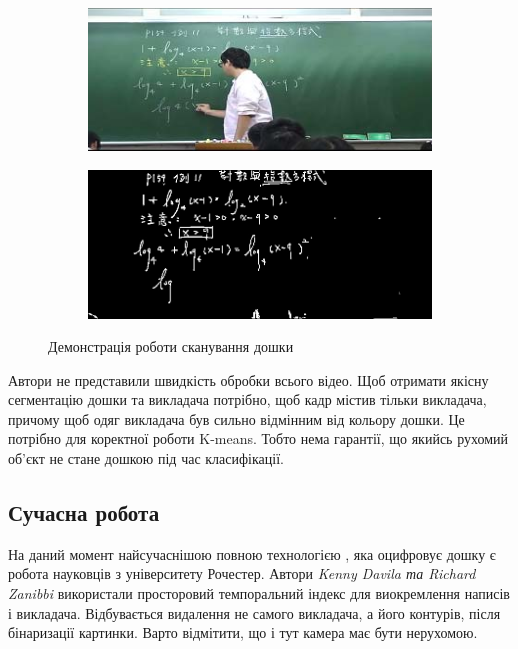 \begin{figure}[h]
  \centering
  \begin{subfigure}[b]{0.3\textwidth}
    \centering
    \includegraphics[width=\textwidth]{images/yeh_1}
  \end{subfigure}
  \begin{subfigure}[b]{0.3\textwidth}
    \centering
    \includegraphics[width=\textwidth]{images/yeh_2}
  \end{subfigure}
  \label{fig:yeh}
  \caption{Демонстрація роботи сканування дошки}
\end{figure}

Автори не представили швидкість обробки всього відео. Щоб отримати якісну сегментацію
дошки та викладача потрібно, щоб кадр містив тільки викладача, причому щоб одяг викладача
був сильно відмінним від кольору дошки. Це потрібно для коректної роботи K-means.
Тобто нема гарантії, що якийсь рухомий об'єкт не стане  дошкою під час класифікації.

\subsection{Сучасна робота}

На даний момент найсучаснішою повною технологією \cite{davila:2017}, яка оцифровує дошку є робота
науковців з університету Рочестер. Автори \textit{Kenny Davila та Richard Zanibbi}
використали просторовий темпоральний індекс для виокремлення написів і викладача.
Відбувається видалення не самого викладача,  а його контурів, після бінаризації картинки.
Варто відмітити, що і тут камера має бути нерухомою.

